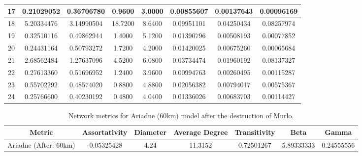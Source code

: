 \documentclass[12pt,a4paper]{thesis}
\begin{document}
\begin{table}[H]
\begin{tabular}{|c|c|c|c|c|c|c|c|}
\hline	17	&	0.21029052	&	0.36706780	&	0.9600	&	3.0000	&	0.00855607	&	0.00137643	&	0.00096169	\\
\hline	18	&	5.20334476	&	3.14990504	&	18.7200	&	8.6400	&	0.09951101	&	0.04250434	&	0.08257974	\\
\hline	19	&	0.32510116	&	0.49862944	&	1.4000	&	5.1200	&	0.01390796	&	0.00508193	&	0.00077852	\\
\hline	20	&	0.24431164	&	0.50793272	&	1.7200	&	4.2000	&	0.01420025	&	0.00675260	&	0.00065684	\\
\hline	21	&	2.68562484	&	1.27637096	&	4.5200	&	6.0800	&	0.03734474	&	0.01960192	&	0.08137327	\\
\hline	22	&	0.27613360	&	0.51696952	&	1.2400	&	3.9600	&	0.00994763	&	0.00260495	&	0.00115287	\\
\hline	23	&	0.55702292	&	0.48574020	&	0.8800	&	4.8800	&	0.02056382	&	0.00794017	&	0.00575367	\\
\hline	24	&	0.25766600	&	0.40230192	&	0.4800	&	4.0400	&	0.01336026	&	0.00683703	&	0.00114427	\\
\hline 
\end{tabular} 
\label{tab:ariadneNodeBefore100}
\end{table}


\begin{table}[H]
\centering
\caption{Network metrics for Ariadne (60km) model after the destruction of Murlo.}
\tiny
\begin{tabular}{|c|c|c|c|c|c|c|}
\hline Metric & Assortativity & Diameter & Average Degree & Transitivity & Beta & Gamma \\ 
\hline Ariadne (After: 60km) & -0.05325428	& 4.24 & 11.3152	& 0.72501267 & 5.89333333 & 0.24555556 \\ 
\hline 
\end{tabular} 
\label{tab:ariadneNetAfter60}
\end{table}
\end{document}
